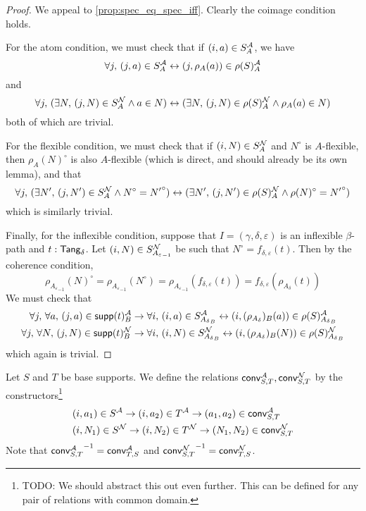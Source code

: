 \begin{proof}
  We appeal to \cref{prop:spec_eq_spec_iff}.
  Clearly the coimage condition holds.

  For the atom condition, we must check that if \( (i, a) \in S_A^{\mathcal A} \), we have
  \[ \forall j,\, (j, a) \in S_A^{\mathcal A} \leftrightarrow (j, \rho_A(a)) \in \rho(S)_A^{\mathcal A} \]
  and
  \[ \forall j,\, (\exists N,\, (j, N) \in S_A^{\mathcal N} \wedge a \in N) \leftrightarrow (\exists N,\, (j, N) \in \rho(S)_A^{\mathcal N} \wedge \rho_A(a) \in N) \]
  both of which are trivial.

  For the flexible condition, we must check that if \( (i, N) \in S_A^{\mathcal N} \) and \( N^\circ \) is \( A \)-flexible, then \( \rho_A(N)^\circ \) is also \( A \)-flexible (which is direct, and should already be its own lemma), and that
  \[ \forall j,\, (\exists N',\, (j, N') \in S_A^{\mathcal N} \wedge N^\circ = {N'}^\circ) \leftrightarrow (\exists N',\, (j, N') \in \rho(S)_A^{\mathcal N} \wedge \rho(N)^\circ = {N'}^\circ) \]
  which is similarly trivial.

  Finally, for the inflexible condition, suppose that \( I = (\gamma,\delta,\varepsilon) \) is an inflexible \( \beta \)-path and \( t : \mathsf{Tang}_\delta \).
  Let \( (i, N) \in S_{{A_\varepsilon}_{-1}}^{\mathcal N} \) be such that \( N^\circ = f_{\delta,\varepsilon}(t) \).
  Then by the coherence condition,
  \[ \rho_{{A_\varepsilon}_{-1}}(N)^\circ = \rho_{{A_\varepsilon}_{-1}}(N^\circ) = \rho_{{A_\varepsilon}_{-1}}(f_{\delta,\varepsilon}(t)) = f_{\delta,\varepsilon}(\rho_{A_\delta}(t)) \]
  We must check that
  \begin{align*}
    \forall j,\, \forall a,\, (j, a) \in \operatorname{\mathsf{supp}}(t)_B^{\mathcal A} &\to \forall i,\, (i, a) \in S_{{A_\delta}_B}^{\mathcal A} \leftrightarrow (i, (\rho_{A_\delta})_B(a)) \in \rho(S)_{{A_\delta}_B}^{\mathcal A} \\
    \forall j,\, \forall N,\, (j, N) \in \operatorname{\mathsf{supp}}(t)_B^{\mathcal N} &\to \forall i,\, (i, N) \in S_{{A_\delta}_B}^{\mathcal N} \leftrightarrow (i, (\rho_{A_\delta})_B(N)) \in \rho(S)_{{A_\delta}_B}^{\mathcal N}
  \end{align*}
  which again is trivial.
\end{proof}
\begin{definition}
  Let \( S \) and \( T \) be base supports.
  We define the relations \( \operatorname{\mathsf{conv}}_{S,T}^{\mathcal A}, \operatorname{\mathsf{conv}}_{S,T}^{\mathcal N} \) by the constructors\footnote{TODO: We should abstract this out even further. This can be defined for any pair of relations with common domain.}
  \begin{align*}
    &(i, a_1) \in S^{\mathcal A} \to (i, a_2) \in T^{\mathcal A} \to (a_1, a_2) \in \operatorname{\mathsf{conv}}_{S,T}^{\mathcal A} \\
    &(i, N_1) \in S^{\mathcal N} \to (i, N_2) \in T^{\mathcal N} \to (N_1, N_2) \in \operatorname{\mathsf{conv}}_{S,T}^{\mathcal N}
  \end{align*}
  Note that \( {\operatorname{\mathsf{conv}}_{S,T}^{\mathcal A}}^{-1} = \operatorname{\mathsf{conv}}_{T,S}^{\mathcal A} \) and \( {\operatorname{\mathsf{conv}}_{S,T}^{\mathcal N}}^{-1} = \operatorname{\mathsf{conv}}_{T,S}^{\mathcal N} \).
\end{definition}
